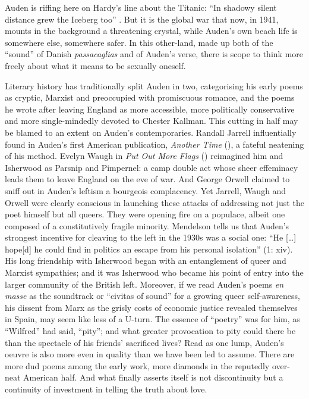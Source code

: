 \documentclass{article}
\begin{document}
\noindent Auden is riffing here on Hardy's line about the Titanic: ``In shadowy
silent distance grew the Iceberg too'' \parencite[248]{hardy_complete_1976}. But it is the
global war that now, in 1941, mounts in the background a threatening
crystal, while Auden's own beach life is somewhere else, somewhere
safer. In this other-land, made up both of the ``sound'' of Danish
\emph{passacaglias} and of Auden's verse, there is scope to think more freely
about what it means to be sexually oneself.

Literary history has traditionally split Auden in two, categorising his
early poems as cryptic, Marxist and preoccupied with promiscuous
romance, and the poems he wrote after leaving England as more
accessible, more politically conservative and more single-mindedly devoted to
Chester Kallman. This cutting in half may be blamed to an extent on
Auden's contemporaries. Randall Jarrell influentially found in Auden's
first American publication, \emph{Another Time} (\citeyear{auden_another_1940}), a fateful
neatening of his method. Evelyn Waugh in \emph{Put Out More Flags} (\citeyear{waugh_put_1942})
reimagined him and Isherwood as Parsnip and Pimpernel: a camp double act
whose sheer effeminacy leads them to leave England on the eve of war.
And George Orwell claimed to sniff out in Auden's leftism a bourgeois
complacency. Yet Jarrell, Waugh and Orwell were clearly conscious in
launching these attacks of addressing not just the poet himself but all queers. They were opening fire on a populace, albeit one composed
of a constitutively fragile minority. Mendelson tells us that
Auden's strongest incentive for cleaving to the left in the 1930s was a
social one: ``He [\dots] hope{[}d{]} he could find in politics an
escape from his personal isolation'' (1: xiv). His long friendship with
Isherwood began with an entanglement of queer and Marxist sympathies;
and it was Isherwood who became his point of entry into the larger
community of the British left. Moreover, if we read Auden's poems
\emph{en masse} as the soundtrack or ``civitas of sound'' for a growing
queer self-awareness, his dissent from Marx as the grisly costs of
economic justice revealed themselves in Spain, may seem like less of a
U-turn. The essence of ``poetry'' was for him, as ``Wilfred'' had said,
``pity''; and what greater provocation to pity could there be than the spectacle of his friends' sacrificed lives? Read as one lump, Auden's oeuvre is also more
even in quality than we have been led to assume. There are more dud
poems among the early work, more diamonds in the reputedly over-neat
American half. And what finally asserts itself is not discontinuity but
a continuity of investment in telling the truth about love.
\end{document}
